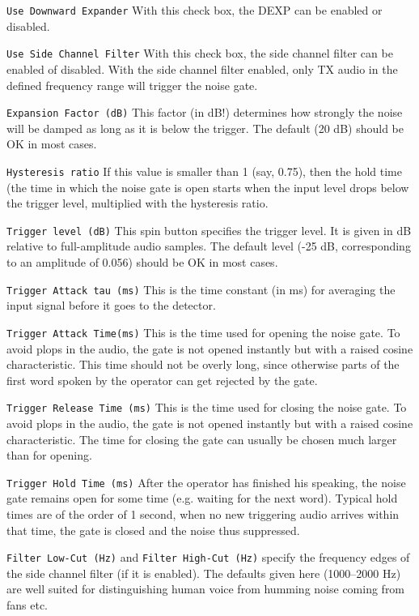 \documentclass[12pt]{book}
\def\rett#1{\texttt{\color{red}#1}}
\begin{document}
\rett{Use Downward Expander} With this check box, the DEXP can be enabled or disabled.

\rett{Use Side Channel Filter} With this check box, the side channel filter can be enabled of disabled.
With the  side channel filter enabled, only TX audio in the defined frequency  range will trigger the
noise gate.

\rett{Expansion Factor (dB)} This factor (in dB!) determines how strongly the noise will be damped as long
as it is below the trigger. The default (20 dB) should be OK in most cases.

\rett{Hysteresis ratio} If this  value is smaller than 1 (say, 0.75), then the hold time (the time in which the noise
gate is open starts when the input level drops below the trigger level, multiplied with the hysteresis ratio.

\rett{Trigger level (dB)} This spin button specifies the trigger level. It is given in dB relative to
full-amplitude audio samples. The default level (-25 dB, corresponding to an amplitude of 0.056) should
be OK in most cases.

\rett{Trigger Attack tau (ms)} This is the time constant (in ms) for averaging the input signal before
it goes to the detector.

\rett{Trigger Attack Time(ms)} This is the time used for opening the noise gate. To avoid plops in the
audio, the gate is not opened instantly but with a raised cosine characteristic. This time should not
be overly long, since otherwise parts of the first word spoken by the operator can get rejected by
the gate.

\rett{Trigger Release Time (ms)} This is the time used for closing the noise  gate. To avoid plops in the
audio, the gate is not opened instantly but with a raised cosine characteristic. The time for closing the
gate can usually be chosen much larger than for  opening.

\rett{Trigger Hold Time (ms)} After the operator has finished his speaking, the noise gate remains open
for some time (e.g. waiting for the next word). Typical hold times are of the order of 1 second, when no
new triggering audio arrives within that time, the gate is closed and the noise  thus suppressed.

\rett{Filter Low-Cut (Hz)} and \rett{Filter  High-Cut (Hz)} specify the frequency edges of the side
channel filter (if it is enabled). The defaults given here (1000--2000 Hz) are well suited  for distinguishing
human voice from humming noise coming from fans etc.
\end{document}
